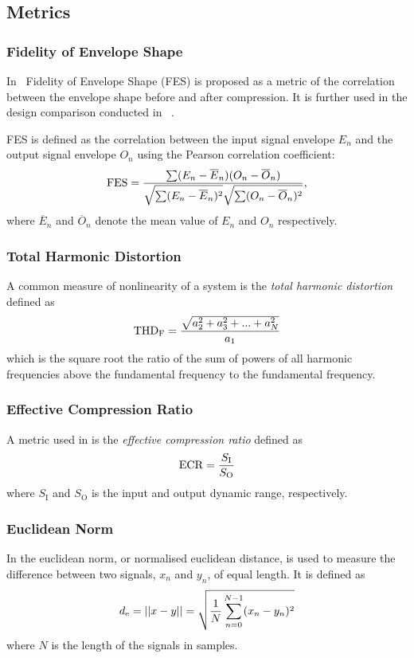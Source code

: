\documentclass[../main2.tex]{subfiles}
\begin{document}
\subsection{Metrics}\label{theory_metrics}

\subsubsection{Fidelity of Envelope Shape} \label{fes}
In~\cite{stone2007quantifying} Fidelity of Envelope Shape (FES) is proposed as a metric of the correlation between the envelope shape before and after compression. It is further used in the design comparison conducted in ~\cite{reiss2012tutorial}.

FES is defined as the correlation between the input signal envelope $E_n$ and the output signal envelope $O_n$ using the Pearson correlation coefficient: \begin{equation}
\text{FES} = \dfrac{\sum(E_n - \overline{E}_n)(O_n - \overline{O}_n)}{\sqrt{\sum(E_n - \overline{E}_n )^2}\sqrt{\sum(O_n - \overline{O}_n )^2}},
\end{equation}
where $\overline{E}_n$ and $\overline{O}_n$ denote the mean value of $E_n$ and $O_n$ respectively.

\subsubsection{Total Harmonic Distortion}
A common measure of nonlinearity of a system is the \emph{total harmonic distortion} defined as \cite{shmilovitz2005definition}
\begin{align}
\text{THD}_\text{F} = \dfrac{\sqrt{a_2^2 + a_3^2 + ... + a_N^2}}{a_1}
\end{align}
which is the square root the ratio of the sum of powers of all harmonic frequencies above the fundamental frequency to the fundamental frequency.

\subsubsection{Effective Compression Ratio}
A metric used in \cite{stone1992syllabic} is the \emph{effective compression ratio} defined as
\begin{align}
\text{ECR} = \dfrac{S_\text{I}}{S_\text{O}}
\end{align}
where $S_\text{I}$ and $S_\text{O}$ is the input  and output dynamic range, respectively.

\subsubsection{Euclidean Norm}
In \cite{bitzer2006parameter} the euclidean norm, or normalised euclidean distance, is used to measure the difference between two signals, $x_n$ and $y_n$, of equal length. It is defined as
\begin{align}
d_\text{e} = ||x-y|| = \sqrt{\frac{1}{N}\sum_{n=0}^{N-1}(x_n-y_n)^2}
\end{align}
where $N$ is the length of the signals in samples.
\end{document}

